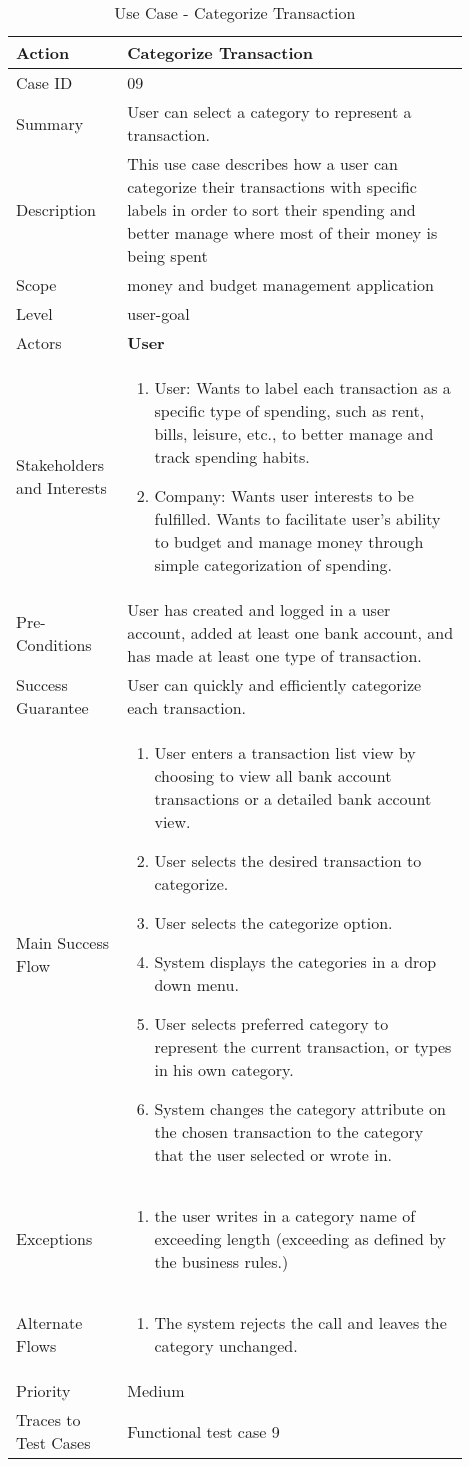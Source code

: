 \documentclass[11pt]{article}
\newcounter{use case ID}
\newcommand\tabularhead[1]{
    \begin{table}[ht]
        \addtocounter{use case ID}{1}
        \caption{Use Case \arabic{use case ID} - #1}
        \vspace{0.2cm}
        \begin{tabular}{|p{0.2\linewidth}|p{0.70\linewidth}|}
            \hline
            \textbf{Action} & \textbf{#1} \\
            \hline}
\newcommand\addrow[2]{#1 & #2\\ \hline}
\newcommand\addmulrow[2]{ \begin{minipage}[t][][t]{2.5cm}#1\end{minipage}
                &\begin{minipage}[t][][t]{11cm}
                    \begin{enumerate}[itemsep=-1ex] #2   \end{enumerate}
                \end{minipage}\vfill\\ \hline}
\newenvironment{usecase}{\tabularhead}
        {\hline\end{tabular}\end{table}}
\begin{document}
\begin{usecase}{Categorize Transaction}
    \addrow{Case ID}{09}
    \addrow{Summary}{User can select a category to represent a transaction.}
    \addrow{Description} {This use case describes how a user can categorize their transactions with specific labels in order to sort their spending and better manage where most of their money is being spent }
     \addrow{Scope}{money and budget management application}
     \addrow{Level}{user-goal}
     \addrow{Actors}{\textbf{User}}
     \addmulrow{Stakeholders and Interests}{
     \item User: Wants to label each transaction as a specific type of spending, such as rent, bills, leisure, etc., to better manage and track spending habits.
     \item Company: Wants user interests to be fulfilled. Wants to facilitate user's ability to budget and manage money through simple categorization of spending.}
     \addrow{Pre-Conditions}{User has created and logged in a user account, added at least one bank account, and has made at least one type of transaction.}
     \addrow{Success Guarantee}{User can quickly and efficiently categorize each transaction.}
     \addmulrow{Main Success Flow}{
     \item User enters a transaction list view by choosing to view all bank account transactions or a detailed bank account view.
     \item User selects the desired transaction to categorize.
     \item User selects the categorize option.
     \item System displays the categories in a drop down menu.
     \item User selects preferred category to represent the current transaction, or types in his own category.
     \item System changes the category attribute on the chosen transaction to the category that the user selected or wrote in.}
     \addmulrow{Exceptions} {
        \item the user writes in a category name of exceeding length (exceeding as defined by the business rules.)
     }
     \addmulrow{Alternate Flows}{
        \item The system rejects the call and leaves the category unchanged.
     }
     \addrow{Priority}{Medium}
     \addrow{Traces to Test Cases}{Functional test case 9}

\end{usecase}
\end{document}
